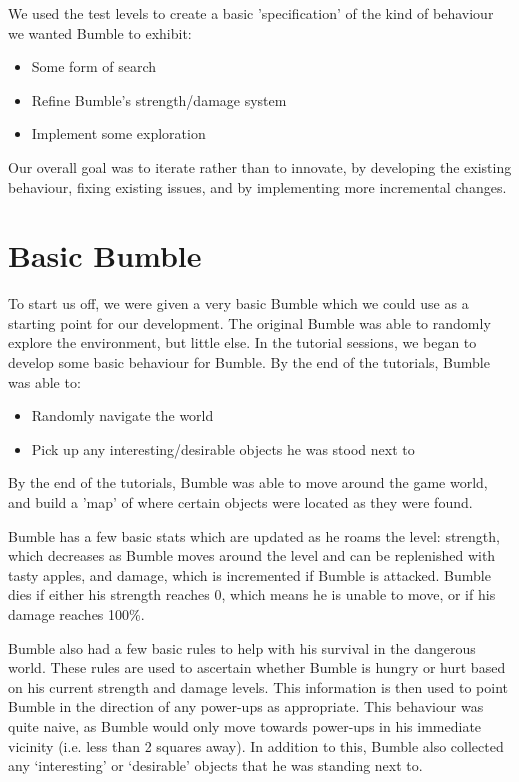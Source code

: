 \documentclass[a4paper,oneside]{report}
\begin{document}
We used the test levels to create a basic 'specification' of the kind of behaviour we wanted Bumble to exhibit:

\begin{itemize}
	\item Some form of search
	\item Refine Bumble's strength/damage system
	\item Implement some exploration
\end{itemize}

Our overall goal was to iterate rather than to innovate, by developing the existing behaviour, fixing existing issues, and by implementing more incremental changes.

\section{Basic Bumble}

To start us off, we were given a very basic Bumble which we could use as a starting point for our development. The original Bumble was able to randomly explore the environment, but little else. In the tutorial sessions, we began to develop some basic behaviour for Bumble. By the end of the tutorials, Bumble was able to:

\begin{itemize}
	\item Randomly navigate the world
	\item Pick up any interesting/desirable objects he was stood next to
\end{itemize}





By the end of the tutorials, Bumble was able to move around the game world, and build a 'map' of where certain objects were located as they were found. 


Bumble has a few basic stats which are updated as he roams the level: strength, which decreases as Bumble moves around the level and can be replenished with tasty apples, and damage, which is incremented if Bumble is attacked. Bumble dies if either his strength reaches 0, which means he is unable to move, or if his damage reaches 100\%.

Bumble also had a few basic rules to help with his survival in the dangerous world. These rules are used to ascertain whether Bumble is hungry or hurt based on his current strength and damage levels. This information is then used to point Bumble in the direction of any power-ups as appropriate. This behaviour was quite naive, as Bumble would only move towards power-ups in his immediate vicinity (i.e. less than 2 squares away). In addition to this, Bumble also collected any `interesting' or `desirable' objects that he was standing next to.
\end{document}
